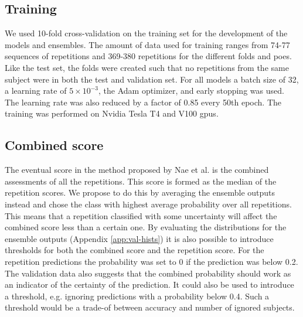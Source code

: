 \subsection{Training} \label{sec:met-training}
We used 10-fold cross-validation on the training set for the development of the models and ensembles. The amount of data used for training ranges from 74-77 sequences of repetitions and 369-380 repetitions for the different folds and \glspl{poe}. Like the test set, the folds were created such that no repetitions from the same subject were in both the test and validation set. For all models a batch size of 32, a learning rate of $5 \times 10^{-3}$, the Adam optimizer, and early stopping was used. The learning rate was also reduced by a factor of 0.85 every 50th epoch. The training was performed on Nvidia Tesla T4 and V100 \glspl{gpu}.


\subsection{Combined score} \label{sec:met-combined}
The eventual score in the method proposed by Nae et al. \cite{Nae2020b} is the combined assessments of all the repetitions. This score is formed as the median of the repetition scores. We propose to do this by averaging the ensemble outputs instead and chose the class with highest average probability over all repetitions. This means that a repetition classified with some uncertainty will affect the combined score less than a certain one. By evaluating the distributions for the ensemble outputs (Appendix \ref{app:val-hists}) it is also possible to introduce thresholds for both the combined score and the repetition score. For the repetition predictions the probability was set to 0 if the prediction was below 0.2. The validation data also suggests that the combined probability should work as an indicator of the certainty of the prediction. It could also be used to introduce a threshold, e.g. ignoring predictions with a probability below 0.4. Such a threshold would be a trade-of between accuracy and number of ignored subjects.
